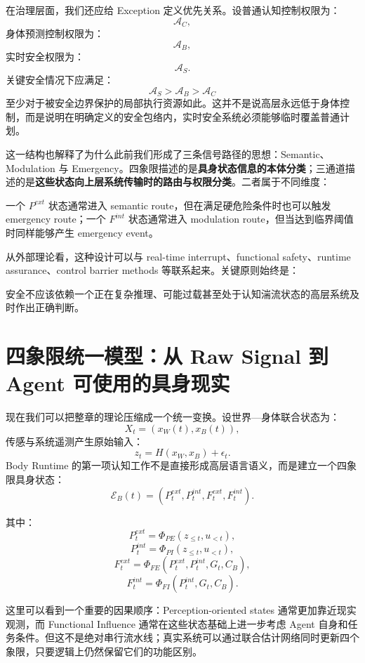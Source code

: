 在治理层面，我们还应给 Exception 定义优先关系。设普通认知控制权限为：
\[
\mathcal A_C,
\]
身体预测控制权限为：
\[
\mathcal A_B,
\]
实时安全权限为：
\[
\mathcal A_S.
\]
关键安全情况下应满足：
\[
\boxed{
\mathcal A_S
>
\mathcal A_B
>
\mathcal A_C
}
\]
至少对于被安全边界保护的局部执行资源如此。这并不是说高层永远低于身体控制，而是说明在明确定义的安全包络内，实时安全系统必须能够临时覆盖普通计划。

这一结构也解释了为什么此前我们形成了三条信号路径的思想：Semantic、Modulation 与 Emergency。四象限描述的是\textbf{具身状态信息的本体分类}；三通道描述的是\textbf{这些状态向上层系统传输时的路由与权限分类}。二者属于不同维度：
\begin{statementbox}
\centering
{}
\end{statementbox}
一个 $P^{ext}$ 状态通常进入 semantic route，但在满足硬危险条件时也可以触发 emergency route；一个 $F^{int}$ 状态通常进入 modulation route，但当达到临界阈值时同样能够产生 emergency event。

从外部理论看，这种设计可以与 real-time interrupt、functional safety、runtime assurance、control barrier methods 等联系起来。关键原则始终是：
\begin{statementbox}
\centering
{}
\end{statementbox}
安全不应该依赖一个正在复杂推理、可能过载甚至处于认知湍流状态的高层系统及时作出正确判断。

\section{四象限统一模型：从 Raw Signal 到 Agent 可使用的具身现实}
\label{sec:four-quadrant-unified-model}

现在我们可以把整章的理论压缩成一个统一变换。设世界—身体联合状态为：
\[
X_t
=
(
x_W(t),
x_B(t)
),
\]
传感与系统遥测产生原始输入：
\[
z_t
=
H(
x_W,
x_B
)
+
\epsilon_t.
\]
Body Runtime 的第一项认知工作不是直接形成高层语言语义，而是建立一个四象限具身状态：
\[
\boxed{
\mathcal E_B(t)
=
\left(
P_t^{ext},
P_t^{int},
F_t^{ext},
F_t^{int}
\right).
}
\]

其中：
\[
P_t^{ext}
=
\Phi_{PE}
(
z_{\leq t},
u_{<t}
),
\]
\[
P_t^{int}
=
\Phi_{PI}
(
z_{\leq t},
u_{<t}
),
\]
\[
F_t^{ext}
=
\Phi_{FE}
(
P_t^{ext},
P_t^{int},
G_t,
C_B
),
\]
\[
F_t^{int}
=
\Phi_{FI}
(
P_t^{int},
G_t,
C_B
).
\]

这里可以看到一个重要的因果顺序：Perception-oriented states 通常更加靠近现实观测，而 Functional Influence 通常在这些状态基础上进一步考虑 Agent 自身和任务条件。但这不是绝对串行流水线；真实系统可以通过联合估计网络同时更新四个象限，只要逻辑上仍然保留它们的功能区别。

